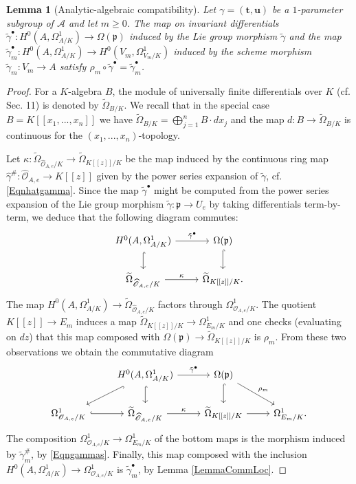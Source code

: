 \documentclass[11pt]{amsart}
\newtheorem{lemma}[theorem]{Lemma}
\theoremstyle{remark}
\numberwithin{equation}{section}
\newcommand{\pfrak}{\mathfrak{p}}
\newcommand{\Acal}{\mathscr{A}}
\newcommand{\Ocal}{\mathscr{O}}
\newcommand{\ttt}{\mathbf{t}}
\newcommand{\uu}{\mathbf{u}}
\begin{document}
\begin{lemma}[Analytic-algebraic compatibility] \label{LemmaCompatibility} Let $\gamma=(\ttt,\uu)$ be a $1$-parameter subgroup of $\Acal$ and let $m\ge 0$. The map on invariant differentials $\tilde{\gamma}^\bullet : H^0(A,\Omega^1_{A/K})\to \Omega(\pfrak)$ induced by the Lie group morphism $\tilde{\gamma}$ and the map $\tilde{\gamma}_m^\bullet : H^0(A,\Omega^1_{A/K})\to H^0(V_m,\Omega^1_{V_m/K})$ induced by the scheme morphism $\tilde{\gamma}_m:V_m\to A$ satisfy $\rho_m\circ \tilde{\gamma}^\bullet=\tilde{\gamma}_m^\bullet$.
\end{lemma}
\begin{proof} For a $K$-algebra $B$, the module of universally finite differentials over $K$ (cf. \cite{KunzDiff} Sec. 11) is denoted by $\widetilde{\Omega}_{B/K}$. We recall that in the special case $B=K[[x_1,...,x_n]]$ we have $\widetilde{\Omega}_{B/K}=\bigoplus_{j=1}^n B\cdot dx_j$ and the map $d:B\to \widetilde{\Omega}_{B/K}$ is continuous for the $(x_1,...,x_n)$-topology.

Let $\kappa:\widetilde{\Omega}_{\widehat{\Ocal}_{A,e}/K}\to \widetilde{\Omega}_{K[[z]]/K}$ be the map induced by the continuous ring map $\widehat{\gamma}^\# : \widehat{\Ocal}_{A,e}\to K[[z]]$ given by the power series expansion of $\tilde{\gamma}$, cf. \eqref{Eqnhatgamma}. Since the map $\tilde{\gamma}^\bullet$ might be computed from the power series expansion of the Lie group morphism $\tilde{\gamma}: \pfrak\to U_e$ by taking differentials term-by-term, we deduce that the following diagram commutes:
$$
\begin{tikzcd}
  H^0(A,\Omega^1_{A/K}) \arrow{r}{\tilde{\gamma}^\bullet}   \arrow[hook]{d}   & \Omega(\pfrak) \arrow[hook]{d} \\
  \widetilde{\Omega}_{\widehat{\Ocal}_{A,e}/K} \arrow{r}{\kappa} &\widetilde{\Omega}_{K[[z]]/K}.
\end{tikzcd}
$$
The map $H^0(A,\Omega^1_{A/K})\to \widetilde{\Omega}_{\widehat{\Ocal}_{A,e}/K}$ factors through $\Omega^1_{\Ocal_{A,e}/K}$. The quotient $K[[z]]\to E_m$ induces a map $\widetilde{\Omega}_{K[[z]]/K}\to \Omega^1_{E_m/K}$ and one checks (evaluating on $dz$) that this map composed with $\Omega(\pfrak)\to \widetilde{\Omega}_{K[[z]]/K}$ is $\rho_m$. From these two observations we obtain the commutative diagram
$$
\begin{tikzcd}
   & H^0(A,\Omega^1_{A/K}) \arrow{r}{\tilde{\gamma}^\bullet}   \arrow[hook]{d}  \arrow[hook]{ld}  &  \Omega(\pfrak) \arrow[hook]{d} \arrow{rd}{\rho_m} & \\
\Omega^1_{\Ocal_{A,e}/K} \arrow[hook]{r}& \widetilde{\Omega}_{\widehat{\Ocal}_{A,e}/K} \arrow{r}{\kappa} &\widetilde{\Omega}_{K[[z]]/K}\arrow{r} & \Omega^1_{E_m/K}.
\end{tikzcd}
$$
The composition $\Omega^1_{\Ocal_{A,e}/K}\to \Omega^1_{E_m/K}$ of the bottom maps is the morphism induced by $\tilde{\gamma}^\#_m$, by \eqref{Eqngammas}. Finally, this map composed with the inclusion $H^0(A,\Omega^1_{A/K})\to \Omega^1_{\Ocal_{A,e}/K}$ is $\tilde{\gamma}^\bullet_m$, by Lemma \ref{LemmaCommLoc}.
\end{proof}
\end{document}
